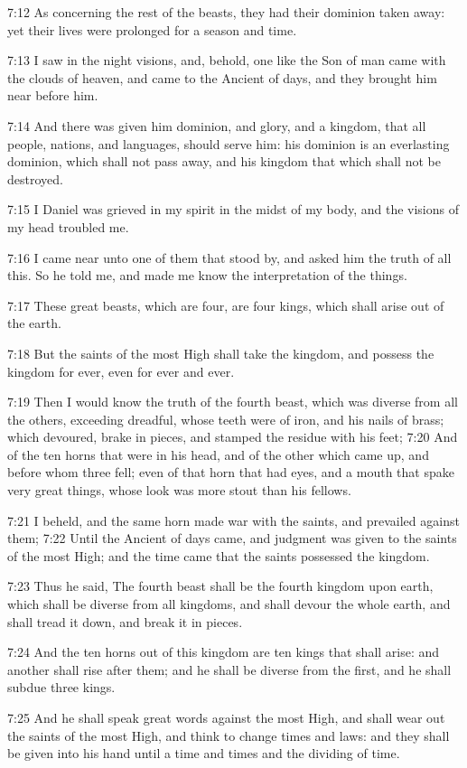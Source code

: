 7:12 As concerning the rest of the beasts, they had their dominion taken away: yet their lives were prolonged for a season and time.

7:13 I saw in the night visions, and, behold, one like the Son of man came with the clouds of heaven, and came to the Ancient of days, and they brought him near before him.

7:14 And there was given him dominion, and glory, and a kingdom, that all people, nations, and languages, should serve him: his dominion is an everlasting dominion, which shall not pass away, and his kingdom that which shall not be destroyed.

7:15 I Daniel was grieved in my spirit in the midst of my body, and the visions of my head troubled me.

7:16 I came near unto one of them that stood by, and asked him the truth of all this. So he told me, and made me know the interpretation of the things.

7:17 These great beasts, which are four, are four kings, which shall arise out of the earth.

7:18 But the saints of the most High shall take the kingdom, and possess the kingdom for ever, even for ever and ever.

7:19 Then I would know the truth of the fourth beast, which was diverse from all the others, exceeding dreadful, whose teeth were of iron, and his nails of brass; which devoured, brake in pieces, and stamped the residue with his feet; 7:20 And of the ten horns that were in his head, and of the other which came up, and before whom three fell; even of that horn that had eyes, and a mouth that spake very great things, whose look was more stout than his fellows.

7:21 I beheld, and the same horn made war with the saints, and prevailed against them; 7:22 Until the Ancient of days came, and judgment was given to the saints of the most High; and the time came that the saints possessed the kingdom.

7:23 Thus he said, The fourth beast shall be the fourth kingdom upon earth, which shall be diverse from all kingdoms, and shall devour the whole earth, and shall tread it down, and break it in pieces.

7:24 And the ten horns out of this kingdom are ten kings that shall arise: and another shall rise after them; and he shall be diverse from the first, and he shall subdue three kings.

7:25 And he shall speak great words against the most High, and shall wear out the saints of the most High, and think to change times and laws: and they shall be given into his hand until a time and times and the dividing of time.

